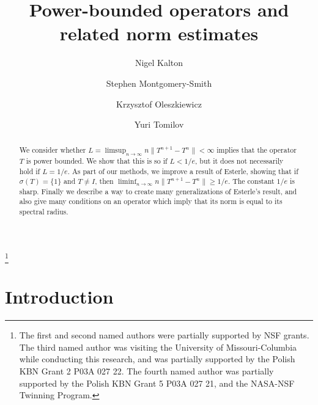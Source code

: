 \documentclass[12pt]{amsart}
\newcommand{\snormo}[1]{{\mathopen\|#1\mathclose\|}}
\begin{document}
\title[Power-bounded operators]{Power-bounded
operators and related norm estimates}

\author[Kalton]{Nigel Kalton}
\makeatletter
\address{Department of Mathematics,
University of Missouri,
Columbia, MO 65211}
\author[Montgomery-Smith]{Stephen Montgomery-Smith}
\makeatletter
\address{Department of Mathematics,
University of Missouri,
Columbia, MO 65211}
\author[Oleszkiewicz]{Krzysztof Oleszkiewicz}
\address{Institute of Mathematics,
Warsaw University,
Banacha 2,
02-097 Warsaw,
Poland}
\author[Tomilov]{Yuri Tomilov}
\address{Department of Mathematics and Informatics,
Nicholas Copernicus University,
Chopin Str. 12/18,
87-100 Torun,
Poland}
\thanks{The first and second named authors were
partially supported
by NSF grants.  The third named author was visiting the
University of Missouri-Columbia
while conducting this research,
and was partially supported by
the Polish KBN Grant 2 P03A 027 22.
The fourth named author was partially supported by the Polish KBN Grant
5 P03A 027 21, and the NASA-NSF Twinning Program.}

\begin{abstract}
\noindent
We consider whether
$ L = \limsup_{n\to\infty} n \snormo{T^{n+1}-T^n} < \infty$ implies
that the operator $T$ is power bounded.
We show that this is so if $L<1/e$, but it
does not necessarily hold if $L=1/e$.
As part of our methods,
we improve a result of Esterle, showing that
if $\sigma(T) = \{1\}$ and $T \ne I$, then
$\liminf_{n\to\infty} n \snormo{T^{n+1}-T^n} \ge 1/e$.
The constant $1/e$ is sharp.
Finally we describe a way to create many generalizations of Esterle's result,
and also give many conditions on an operator which imply that its norm is
equal to its spectral radius.
\end{abstract}

\maketitle

\section{Introduction}
\end{document}
